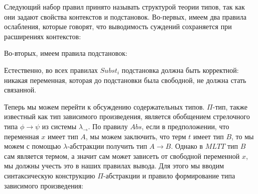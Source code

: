 \documentclass{article}[12pt]
\begin{document}
Следующий набор правил принято называть структурой теории типов, так как они задают свойства контекстов
и подстановок. Во-первых, имеем два правила ослабления, которые говорят, что выводимость суждений
сохраняется при расширениях контекстов:
\begin{multicols}{2}
    \begin{prooftree}
    \end{prooftree}
    \begin{prooftree}
    \end{prooftree}
\end{multicols}
Во-вторых, имеем правила подстановок:
\begin{multicols}{2}
    \begin{prooftree}
    \end{prooftree}
    \begin{prooftree}
    \end{prooftree}
\end{multicols}
\begin{prooftree}
\end{prooftree}
Естественно, во всех правилах $Subst_i$ подстановка должна быть корректной: никакая переменная, которая до
подстановки была свободной, не должна стать связанной. 

Теперь мы можем перейти к обсуждению содержательных типов. $\Pi$-тип, также известный как тип зависимого
произведения, является обобщением стрелочного типа $\phi \rightarrow \psi$ из системы $\lambda_\rightarrow$.
По правилу $Abs$, если в предположении, что переменная $x$ имеет тип $A$, мы можем заключить, что терм $t$
имеет тип $B$, то мы можем с помощью $\lambda$-абстракции получить тип $A \rightarrow B$. Однако в $MLTT$
тип $B$ сам является термом, а значит сам может зависеть от свободной переменной $x$, мы должны учесть это
в наших правилах вывода. Для этого мы вводим синтаксическую конструкцию $\Pi$-абстракции и правило формирование типа
зависимого произведения:
\begin{prooftree}
\end{prooftree}
\end{document}

